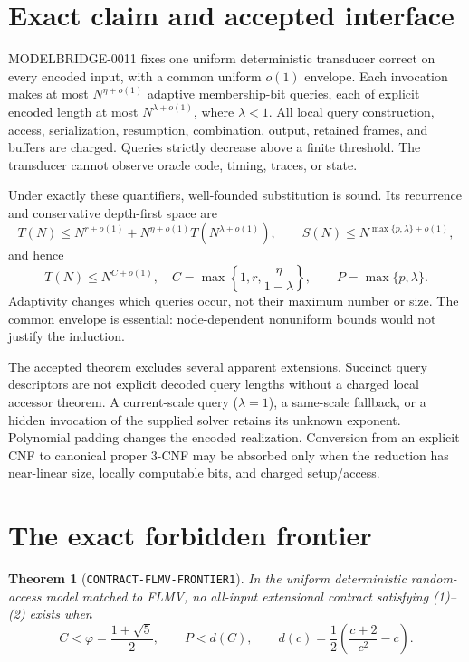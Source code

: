 \documentclass[11pt]{article}
\newtheorem{theorem}{Theorem}
\begin{document}
\section{Exact claim and accepted interface}

MODELBRIDGE-0011 fixes one uniform deterministic transducer correct on every
encoded input, with a common uniform $o(1)$ envelope.  Each invocation makes
at most $N^{\eta+o(1)}$ adaptive membership-bit queries, each of explicit
encoded length at most $N^{\lambda+o(1)}$, where $\lambda<1$.  All local
query construction, access, serialization, resumption, combination, output,
retained frames, and buffers are charged.  Queries strictly decrease above a
finite threshold.  The transducer cannot observe oracle code, timing, traces,
or state.

Under exactly these quantifiers, well-founded substitution is sound.  Its
recurrence and conservative depth-first space are
\[
 T(N)\le N^{r+o(1)}+N^{\eta+o(1)}
       T(N^{\lambda+o(1)}),\qquad
 S(N)\le N^{\max\{p,\lambda\}+o(1)},                     \tag{1}
\]
and hence
\[
 T(N)\le N^{C+o(1)},\quad
 C=\max\left\{1,r,\frac{\eta}{1-\lambda}\right\},\qquad
 P=\max\{p,\lambda\}.                                    \tag{2}
\]
Adaptivity changes which queries occur, not their maximum number or size.
The common envelope is essential: node-dependent nonuniform bounds would not
justify the induction.

The accepted theorem excludes several apparent extensions.  Succinct query
descriptors are not explicit decoded query lengths without a charged local
accessor theorem.  A current-scale query ($\lambda=1$), a same-scale fallback,
or a hidden invocation of the supplied solver retains its unknown exponent.
Polynomial padding changes the encoded realization.  Conversion from an
explicit CNF to canonical proper 3-CNF may be absorbed only when the reduction
has near-linear size, locally computable bits, and charged setup/access.

\section{The exact forbidden frontier}

\begin{theorem}[\texttt{CONTRACT-FLMV-FRONTIER1}]
In the uniform deterministic random-access model matched to FLMV, no
all-input extensional contract satisfying (1)--(2) exists when
\[
 C<\varphi=\frac{1+\sqrt5}{2},\qquad
 P<d(C),\qquad
 d(c)=\frac12\left(\frac{c+2}{c^2}-c\right).             \tag{3}
\]
\end{theorem}
\end{document}
